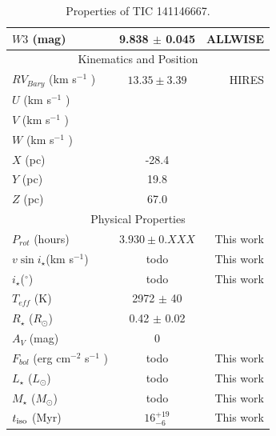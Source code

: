 \documentclass{nature3}
\newcommand{\starname}{TIC 141146667}
\begin{document}
\begin{methods}
\begin{table}
\begin{tabular}{lcr}
    $W3$ (mag)                      &  9.838 $\pm$ 0.045 & ALLWISE   \\
    \hline
    \multicolumn{3}{c}{Kinematics and Position} \\
    \hline
    $RV_{Bary}$ (km s$^{-1}$ ) & $13.35 \pm 3.39$ & HIRES \\
    $U$ (km s$^{-1}$ ) & & \\
    $V$ (km s$^{-1}$ ) & & \\
    $W$ (km s$^{-1}$ ) & & \\
    $X$ (pc) & -28.4 & \\
    $Y$ (pc) &  19.8 & \\
    $Z$ (pc) &  67.0 & \\
    \hline
    \multicolumn{3}{c}{Physical Properties} \\
    \hline
    $P_{rot}$ (hours) & $3.930 \pm 0.XXX$ & This work \\ 
    $v \sin i_\star$(km s$^{-1}$) & todo & This work\\
    $i_\star$($^\circ$) & todo & This work \\
    $T_{eff}$ (K) & 2972 $\pm$ 40 & \cite{Bouma2024}\\
%
    $R_\star$ ($R_{\odot}$) & 0.42 $\pm$ 0.02 & \cite{Bouma2024} \\
    $A_V$ (mag) & 0 & \cite{Green2019} \\
    $F_{bol}$ (erg cm$^{-2}$ s$^{-1}$ ) & todo & This work\\
    $L_\star$ ($L_{\odot}$)  & todo & This work\\
    $M_\star$ ($M_{\odot}$)  & todo & This work\\
    $t_{\rm iso}$ (Myr) & $16^{+19}_{-6}$ &  This work \\
    \hline
    \end{tabular}
    \caption{Properties of \starname.}
    \label{tab:stellarParameters}
\end{table}
\end{methods}

   
\end{document}
